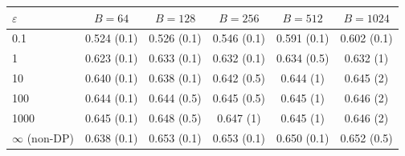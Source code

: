 \begin{tabular}{lccccc}
\toprule
$\varepsilon$ & $B=64$ & $B=128$ & $B=256$ & $B=512$ & $B=1024$\\
\midrule
0.1 & 0.524 (0.1) & 0.526 (0.1) & 0.546 (0.1) & 0.591 (0.1) & 0.602 (0.1) \\
1 & 0.623 (0.1) & 0.633 (0.1) & 0.632 (0.1) & 0.634 (0.5) & 0.632 (1) \\
10 & 0.640 (0.1) & 0.638 (0.1) & 0.642 (0.5) & 0.644 (1) & 0.645 (2) \\
100 & 0.644 (0.1) & 0.644 (0.5) & 0.645 (0.5) & 0.645 (1) & 0.646 (2) \\
1000 & 0.645 (0.1) & 0.648 (0.5) & 0.647 (1) & 0.645 (1) & 0.646 (2) \\
\midrule $\infty$ (non-DP) & 0.638 (0.1) & 0.653 (0.1) & 0.653 (0.1) & 0.650 (0.1) & 0.652 (0.5) \\
\bottomrule
\end{tabular}